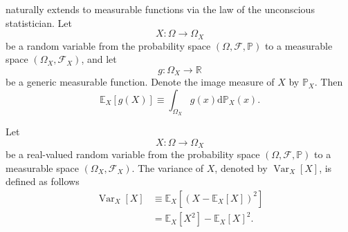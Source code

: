 \begin{remark}
	\label{th:lotus}
	 naturally extends to measurable functions via the law of the unconscious statistician. Let 
	\begin{equation}
		X\colon \Omega \to \Omega_X
	\end{equation}
	be a random variable from the probability space $(\Omega, \mathcal{F}, \mathbb{P})$ to a measurable space $(\Omega_X, \mathcal{F}_X)$, and let 
	\begin{equation}
		g\colon \Omega_X \to \mathbb{R}
	\end{equation} 
	be a generic measurable function. Denote the image measure of $X$ by $\mathbb{P}_X $. Then
	\begin{equation}
		\mathbb{E}_X[g(X)] \equiv \int_{\Omega_X} g(x)\mathrm{d}\mathbb{P}_X(x).
		\label{eq:lotus_image}
	\end{equation}
\end{remark}

\begin{definition}[Variance]
	\label{def:variance}
	Let 
	\begin{equation}
		X\colon \Omega \to \Omega_X
	\end{equation}
	be a real-valued random variable from the probability space $(\Omega, \mathcal{F}, \mathbb{P})$ to a measurable space $(\Omega_X, \mathcal{F}_X)$. The variance of $X$, denoted by $\operatorname{Var}_X[X]$, is defined as follows
	\begin{equation}
		\begin{split}
			\operatorname{Var}_X[X]&\equiv \mathbb{E}_X[(X-\mathbb{E}_X[X])^2]\\
			&= \mathbb{E}_X[X^2]-\mathbb{E}_X[X]^2.
		\end{split}
	\end{equation}
\end{definition}

